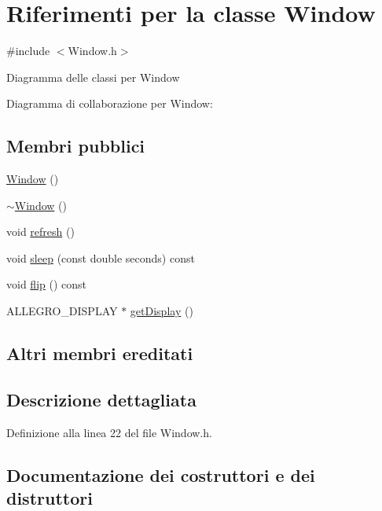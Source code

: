 \hypertarget{class_window}{}\section{Riferimenti per la classe Window}
\label{class_window}


{\ttfamily \#include $<$Window.\+h$>$}



Diagramma delle classi per Window


Diagramma di collaborazione per Window\+:
\subsection*{Membri pubblici}
\begin{DoxyCompactItemize}
\item 
\hyperlink{class_window_a74e6087da23d3c24e9fac0245e5ec92c}{Window} ()
\item 
\hyperlink{class_window_a245d821e6016fa1f6970ccbbedd635f6}{$\sim$\+Window} ()
\item 
void \hyperlink{class_window_ad1a027c3630d4e1a6395bcf1f761e5d8}{refresh} ()
\item 
void \hyperlink{class_window_a797362738ae0b3ff53009713f7060d86}{sleep} (const double seconds) const
\item 
void \hyperlink{class_window_af631f002af0ab2ff38e0bdab9560ce3a}{flip} () const
\item 
A\+L\+L\+E\+G\+R\+O\+\_\+\+D\+I\+S\+P\+L\+AY $\ast$ \hyperlink{class_window_a5a7cca2048dcd75c1f9b6ca594cccad0}{get\+Display} ()
\end{DoxyCompactItemize}
\subsection*{Altri membri ereditati}


\subsection{Descrizione dettagliata}


Definizione alla linea 22 del file Window.\+h.



\subsection{Documentazione dei costruttori e dei distruttori}
\mbox{\label{class_window_a74e6087da23d3c24e9fac0245e5ec92c}} 
